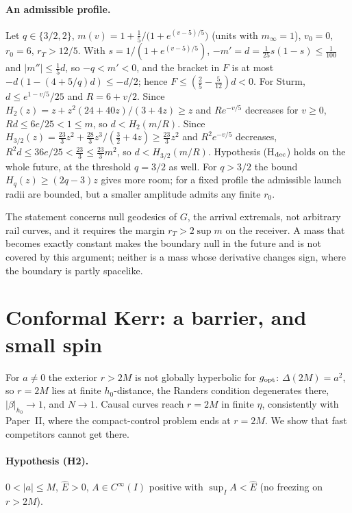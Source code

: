 \documentclass[aip,jmp,amsmath,amssymb,reprint]{revtex4-2}
\newcommand{\Ehat}{\hat E}
\newcommand{\gopt}{g_{\rm opt}}
\theoremstyle{plain}
\theoremstyle{definition}
\begin{document}
\paragraph{An admissible profile.} Let $q\in\{3/2,2\}$, $m(v)=1+\frac15\big/\big(1+e^{(v-5)/5}\big)$ (units with
$m_\infty=1$), $v_0=0$, $r_0=6$, $r_T>12/5$. With $s=1/(1+e^{(v-5)/5})$, $-m'=d=\frac1{25}s(1-s)\le\frac1{100}$ and
$|m''|\le\frac15d$, so $-q<m'<0$, and the bracket in $F$ is at most $-d(1-(4+5/q)d)\le-d/2$; hence
$F\le(\frac25-\frac5{12})d<0$. For Sturm, $d\le e^{1-v/5}/25$ and $R=6+v/2$. Since
$H_2(z)=z+z^2(24+40z)/(3+4z)\ge z$ and $Re^{-v/5}$ decreases for $v\ge0$, $Rd\le6e/25<1\le m$, so
$d<H_2(m/R)$. Since $H_{3/2}(z)=\frac{23}3z^2+\frac{28}3z^3/(\frac32+4z)\ge\frac{23}3z^2$ and $R^2e^{-v/5}$ decreases,
$R^2d\le36e/25<\frac{23}3\le\frac{23}3m^2$, so $d<H_{3/2}(m/R)$. Hypothesis (H$_{\rm dec}$) holds on the whole
future, at the threshold $q=3/2$ as well. For $q>3/2$ the bound $H_q(z)\ge(2q-3)z$ gives more room; for a
fixed profile the admissible launch radii are bounded, but a smaller amplitude admits any finite
$r_0$.

The statement concerns null geodesics of $G$, the arrival extremals, not arbitrary rail curves, and
it requires the margin $r_T>2\sup m$ on the receiver. A mass that becomes exactly constant makes the
boundary null in the future and is not covered by this argument; neither is a mass whose
derivative changes sign, where the boundary is partly spacelike.

\section{Conformal Kerr: a barrier, and small spin}
\label{sec:kerr}
For $a\neq0$ the exterior $r>2M$ is not globally hyperbolic for $\gopt$: $\Delta(2M)=a^2$, so
$r=2M$ lies at finite $h_0$-distance, the Randers condition degenerates there,
$|\beta|_{h_0}\to1$, and $N\to1$. Causal curves reach $r=2M$ in finite $\eta$, consistently
with Paper~II, where the compact-control problem ends at $r=2M$. We show that fast
competitors cannot get there.

\paragraph{Hypothesis (H2).} $0<|a|\le M$, $\Ehat>0$, $A\in C^\infty(I)$ positive with
$\sup_IA<\Ehat$ (no freezing on $r>2M$).
\end{document}
